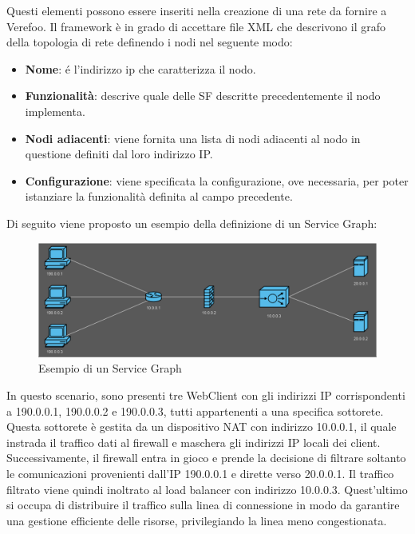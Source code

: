 Questi elementi possono essere inseriti nella creazione di una rete da fornire a Verefoo. Il framework è in grado di accettare file XML che descrivono il grafo della topologia di rete definendo i nodi nel seguente modo:

\begin{itemize}
    \item \textbf{Nome}: é l'indirizzo ip che caratterizza il nodo.
    \item \textbf{Funzionalità}: descrive quale delle SF descritte precedentemente il nodo implementa.
    \item \textbf{Nodi adiacenti}: viene fornita una lista di nodi adiacenti al nodo in questione definiti dal loro indirizzo IP. 
    \item  \textbf{Configurazione}: viene specificata la configurazione, ove necessaria, per poter istanziare la funzionalità definita al campo precedente.
\end{itemize}

Di seguito viene proposto un esempio della definizione di un Service Graph:

\begin{figure}[H]  %
    \centering
    \includegraphics[width=1\textwidth]{ServiceGraph.png}  %
    \caption{Esempio di un Service Graph}
    \label{fig:Service_Graph}
\end{figure}

In questo scenario, sono presenti tre WebClient con gli indirizzi IP corrispondenti a 190.0.0.1, 190.0.0.2 e 190.0.0.3, tutti appartenenti a una specifica sottorete. 
Questa sottorete è gestita da un dispositivo NAT con indirizzo 10.0.0.1, il quale instrada il traffico dati al firewall e maschera gli indirizzi IP locali dei client.
Successivamente, il firewall entra in gioco e prende la decisione di filtrare soltanto le comunicazioni provenienti dall'IP 190.0.0.1 e dirette verso 20.0.0.1. 
Il traffico filtrato viene quindi inoltrato al load balancer con indirizzo 10.0.0.3. 
Quest'ultimo si occupa di distribuire il traffico sulla linea di connessione in modo da garantire una gestione efficiente delle risorse, privilegiando la linea meno congestionata.\\


